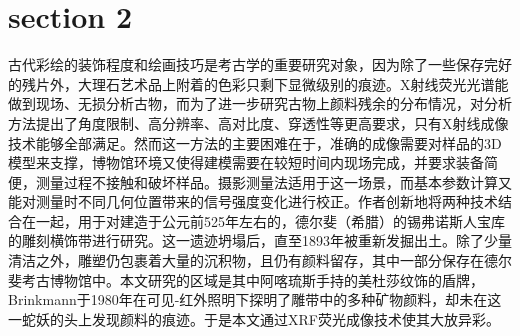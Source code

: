 \documentclass[UTF8,a4paper,fontset=none]{ctexart}
\begin{document}
    \section{section 2}
    古代彩绘的装饰程度和绘画技巧是考古学的重要研究对象，因为除了一些保存完好的残片外，大理石艺术品上附着的色彩只剩下显微级别的痕迹。X射线荧光光谱能做到现场、无损分析古物，而为了进一步研究古物上颜料残余的分布情况，对分析方法提出了角度限制、高分辨率、高对比度、穿透性等更高要求，只有X射线成像技术能够全部满足。然而这一方法的主要困难在于，准确的成像需要对样品的3D模型来支撑，博物馆环境又使得建模需要在较短时间内现场完成，并要求装备简便，测量过程不接触和破坏样品。摄影测量法适用于这一场景，而基本参数计算又能对测量时不同几何位置带来的信号强度变化进行校正。作者创新地将两种技术结合在一起，用于对建造于公元前525年左右的，德尔斐（希腊）的锡弗诺斯人宝库的雕刻横饰带进行研究。这一遗迹坍塌后，直至1893年被重新发掘出土。除了少量清洁之外，雕塑仍包裹着大量的沉积物，且仍有颜料留存，其中一部分保存在德尔斐考古博物馆中。本文研究的区域是其中阿喀琉斯手持的美杜莎纹饰的盾牌，Brinkmann于1980年在可见-红外照明下探明了雕带中的多种矿物颜料，却未在这一蛇妖的头上发现颜料的痕迹。于是本文通过XRF荧光成像技术使其大放异彩。
\end{document}
